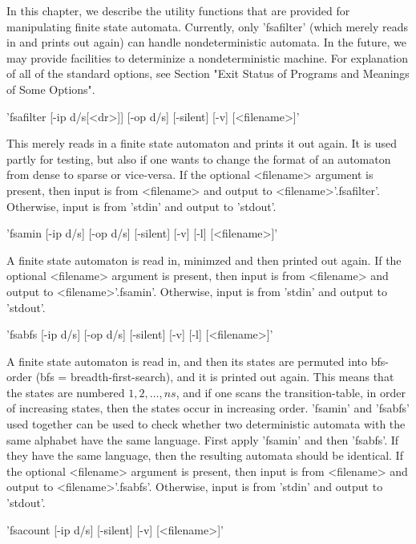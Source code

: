 In this chapter, we describe the utility functions that are provided for
manipulating finite state automata. Currently, only 'fsafilter' (which
merely reads in and prints out again) can handle nondeterministic
automata. In the future, we may provide facilities to determinize a
nondeterministic machine. For explanation of all of the standard options,
see Section "Exit Status of Programs and Meanings of Some Options".


'fsafilter [-ip d/s[<dr>]] [-op d/s] [-silent] [-v] [<filename>]'

This merely reads in a finite state automaton and prints it out again.
It is used partly for testing, but also if one wants to change the format
of an automaton from dense to sparse or vice-versa.
If the optional <filename> argument is present, then input is from <filename>
and output to <filename>'.fsafilter'. Otherwise, input is from 'stdin' and
output to 'stdout'.


'fsamin [-ip d/s] [-op d/s] [-silent] [-v] [-l] [<filename>]'

A finite state automaton is read in, minimzed and then printed out again.
If the optional <filename> argument is present, then input is from <filename>
and output to <filename>'.fsamin'. Otherwise, input is from 'stdin' and
output to 'stdout'.


'fsabfs [-ip d/s] [-op d/s] [-silent] [-v] [-l] [<filename>]'

A finite state automaton is read in, and then its states are permuted into
bfs-order (bfs = breadth-first-search), and it is printed out again.
This means that the states are numbered $1,2, \ldots, ns$, and if one
scans the transition-table, in order of increasing states, then the states
occur in increasing order. 'fsamin' and 'fsabfs' used together can be used
to check whether two deterministic automata with the same alphabet
have the same language.
First apply 'fsamin' and then 'fsabfs'.
If they have the same language, then the resulting automata should be identical.
If the optional <filename> argument is present, then input is from <filename>
and output to <filename>'.fsabfs'. Otherwise, input is from 'stdin' and
output to 'stdout'.


'fsacount  [-ip d/s] [-silent] [-v] [<filename>]'

